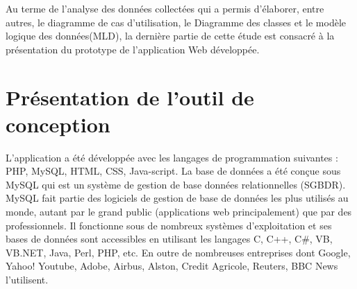 \introduction

Au terme de l'analyse des données collectées qui a permis d'élaborer, entre autres, le diagramme de cas d'utilisation, le Diagramme des classes et le modèle logique des données(MLD), la dernière partie de cette étude est consacré à la présentation du prototype de l'application Web développée. 

\section{Présentation de l'outil de conception}

L'application a été développée avec les langages de programmation suivantes : PHP, MySQL, HTML, CSS, Java-script. La base de données a été conçue sous MySQL qui est un système de gestion de base données relationnelles (SGBDR). MySQL fait partie des logiciels de gestion de base de données les plus utilisés au monde, autant par le grand public (applications web principalement) que par des professionnels. Il fonctionne sous de nombreux systèmes d'exploitation et ses bases de données sont accessibles en utilisant les langages C, C++, C\#, VB, VB.NET, Java, Perl, PHP, etc. En outre de nombreuses entreprises dont Google, Yahoo! Youtube, Adobe, Airbus, Alston, Credit Agricole, Reuters, BBC News l'utilisent.			 


